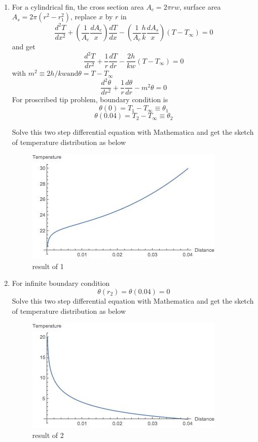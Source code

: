 \begin{solution}
~\\
\begin{enumerate}
\item For a cylindrical fin, the cross section area $A_c=2\pi rw$,
surface area $A_s=2\pi(r^2-r_1^2)$, replace $x$ by $r$ in
$$
\frac{d^2 T}{dx^2} + 
\left(\frac{1}{A_c}\frac{dA_c}{x}\right)\frac{dT}{dx}-
\left(\frac{1}{A_c}\frac{h}{k}\frac{dA_s}{x}\right)(T-T_\infty)=0
$$
and get
$$
\frac{d^2 T}{dr^2}+
\frac{1}{r}\frac{dT}{dr}-
\frac{2h}{kw}(T-T_\infty)=0
$$
with $m^2 \equiv 2h/kw \text{and} \theta=T-T_\infty$
$$
\frac{d^2 \theta}{dr^2}+
\frac{1}{r}\frac{d\theta}{dr}-
m^2\theta=0
$$
For proscribed tip problem, boundary condition is 
$$\theta(0)=T_1-T_\infty \equiv \theta_1$$
$$\theta(0.04)=T_2-T_\infty \equiv \theta_2$$

Solve this two step differential equation with Mathematica and get the sketch of temperature distribution as below
\begin{figure}[h!]
  \centering
    \includegraphics[scale=0.8]{figures/ch2/17}
    \caption{result of 1}
    \label{fig:2:17}
\end{figure}
\item For infinite boundary condition
$$\theta(r_2)=\theta(0.04)=0$$
Solve this two step differential equation with Mathematica and get the sketch of temperature distribution as below
\begin{figure}[h!]
  \centering
    \includegraphics[scale=0.8]{figures/ch2/18}
    \caption{result of 2}
    \label{fig:2:18}
\end{figure}
\end{enumerate}
\end{solution}














